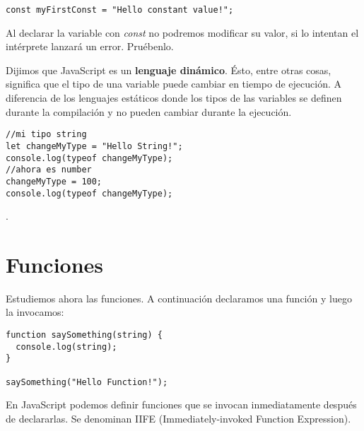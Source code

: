 \documentclass[a4paper, oneside, titlepage, 12pt]{paper}
\begin{document}
\begin{verbatim}
const myFirstConst = "Hello constant value!";
\end{verbatim}

Al declarar la variable con \textit{const} no podremos modificar su valor, si lo intentan el intérprete lanzará un error. Pruébenlo.  


Dijimos que JavaScript es un \textbf{lenguaje dinámico}. Ésto, entre otras cosas, significa que el tipo de una variable puede cambiar en tiempo de ejecución. A diferencia de los lenguajes estáticos donde los tipos de las variables se definen durante la compilación y no pueden cambiar durante la ejecución.

\begin{verbatim}
//mi tipo string
let changeMyType = "Hello String!";
console.log(typeof changeMyType);
//ahora es number
changeMyType = 100;
console.log(typeof changeMyType);
\end{verbatim}

.

\section{Funciones} \label{functions}

Estudiemos ahora las funciones. A continuación declaramos una función y luego la invocamos:

\begin{verbatim}
function saySomething(string) {
  console.log(string);
}

saySomething("Hello Function!");
\end{verbatim}

En JavaScript podemos definir funciones que se invocan inmediatamente después de declararlas. Se denominan IIFE (Immediately-invoked Function Expression).
\end{document}
